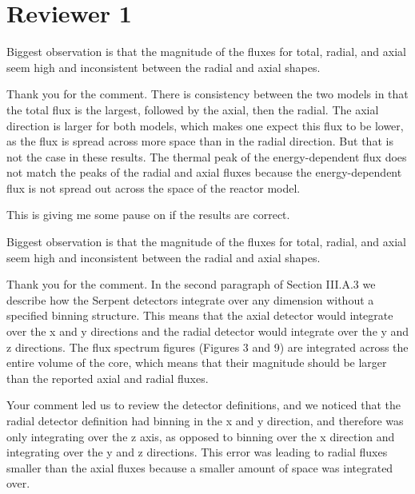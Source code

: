 \documentclass[answers,11pt]{exam}
\begin{document}
\section*{Reviewer 1}
\begin{questions}

        \question Biggest observation is that the magnitude of the fluxes for total, radial, and axial seem high and inconsistent between the radial and axial shapes. 
        \begin{solution}
                Thank you for the comment. There is consistency between the two models in 
                that the total flux is the largest, followed by the axial, then the 
                radial. The axial direction is larger for both models, which makes one 
                expect this flux to be lower, as the flux is spread across more space 
                than in the radial direction. But that is not the case in these 
                results. The thermal peak of the energy-dependent flux does not 
                match the peaks of the radial and axial fluxes because the energy-dependent 
                flux is not spread out across the space of the reactor model. 

                This is giving me some pause on if the results are correct. 
        \end{solution}

	\question Biggest observation is that the magnitude of the fluxes for total,
	radial, and axial seem high and inconsistent between the radial and axial
	shapes.  
        \begin{solution}
                Thank you for the comment. In the second paragraph of Section III.A.3
                we describe how the Serpent detectors integrate over any dimension without 
                a specified binning structure. This means that the axial detector 
                would integrate over the x and y directions and the radial detector 
                would integrate over the y and z directions. The flux spectrum 
                figures (Figures 3 and 9) are integrated across the entire volume 
                of the core, which means that their magnitude should be larger 
                than the reported axial and radial fluxes. 

                Your comment led us to review the detector definitions, and we noticed 
                that the radial detector definition had binning in the x and y direction, 
                and therefore was only integrating over the z axis, as opposed to 
                binning over the x direction and integrating over the y and z 
                directions. This error was 
                leading to radial fluxes smaller than the axial fluxes because a 
                smaller amount of space was integrated over. 


\end{solution}
\end{questions}
\end{document}
